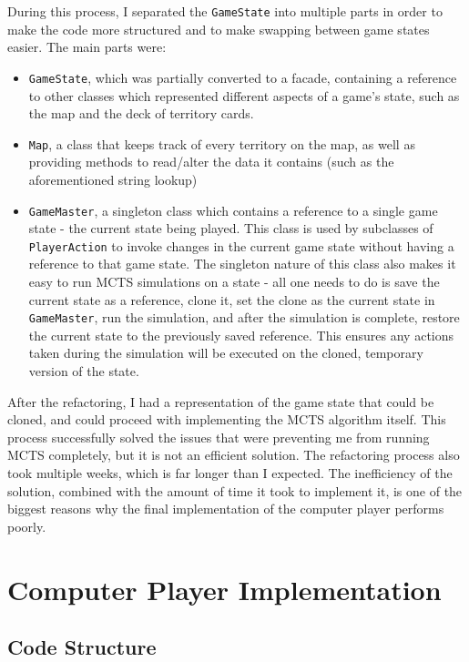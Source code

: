 During this process, I separated the \texttt{GameState} into multiple parts in order to make the code more structured and to make swapping between game states easier. The main parts were:
\begin{itemize}
\item \texttt{GameState}, which was partially converted to a facade, containing a reference to other classes which represented different aspects of a game's state, such as the map and the deck of territory cards.
\item \texttt{Map}, a class that keeps track of every territory on the map, as well as providing methods to read/alter the data it contains (such as the aforementioned string lookup)
\item \texttt{GameMaster}, a singleton class which contains a reference to a single game state - the current state being played. This class is used by subclasses of \texttt{PlayerAction} to invoke changes in the current game state without having a reference to that game state. The singleton nature of this class also makes it easy to run MCTS simulations on a state - all one needs to do is save the current state as a reference, clone it, set the clone as the current state in \texttt{GameMaster}, run the simulation, and after the simulation is complete, restore the current state to the previously saved reference. This ensures any actions taken during the simulation will be executed on the cloned, temporary version of the state.
\end{itemize}

After the refactoring, I had a representation of the game state that could be cloned, and could proceed with implementing the MCTS algorithm itself. This process successfully solved the issues that were preventing me from running MCTS completely, but it is not an efficient solution. The refactoring process also took multiple weeks, which is far longer than I expected. The inefficiency of the solution, combined with the amount of time it took to implement it, is one of the biggest reasons why the final implementation of the computer player performs poorly.

\section{Computer Player Implementation}
\label{computerPlayerImplementation}
\subsection{Code Structure}
\label{computerPlayerCodeStructure}

